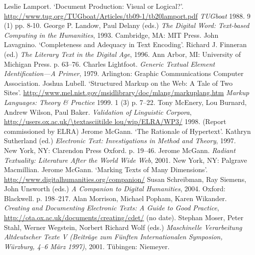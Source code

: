 \begin{bibitemlist}{1}
\label{Lamport1988a}Leslie Lamport. ‘Document Production: Visual or Logical?’.  \url{http://www.tug.org/TUGboat/Articles/tb09-1/tb20lamport.pdf} \textit{TUGboat} 1988. 9  (1)  pp. 8-10. 
\label{Landow1993a}George P. Landow, Paul Delany (eds.) \textit{The Digital Word: Text-based Computing in the Humanities}, 1993. Cambridge, MA: MIT Press. 
\label{Lavagnino1996}John Lavagnino. ‘Completeness and Adequacy in Text Encoding’. Richard J. Finneran (ed.) \textit{The Literary Text in the Digital Age}, 1996. Ann Arbor, MI: University of Michigan Press. p. 63–76. 
\label{Lightfoot1979}Charles Lightfoot. \textit{Generic Textual Element Identification—A Primer}, 1979. Arlington: Graphic Communications Computer Association. 
\label{Lubell1999}Joshua Lubell. ‘Structured Markup on the Web: A Tale of Two Sites’.  \url{http://www.mel.nist.gov/msidlibrary/doc/mlang/markuplang.htm} \textit{Markup Languages: Theory \& Practice} 1999. 1  (3)  p. 7–22. 
\label{McEneryetal1998}Tony McEnery, Lou Burnard, Andrew Wilson, Paul Baker. \textit{Validation of Linguistic Corpora},  \url{http://users.ox.ac.uk/\textasciitilde lou/wip/ELRA/WP3/} 1998.  (Report commissioned by ELRA)
\label{McGann1997}Jerome McGann. ‘The Rationale of Hypertext’. Kathryn Sutherland (ed.) \textit{Electronic Text: Investigations in Method and Theory}, 1997. New York, NY: Clarendon Press Oxford. p. 19–46. 
\label{McGann2001}Jerome McGann. \textit{Radiant Textuality: Literature After the World Wide Web}, 2001. New York, NY: Palgrave Macmillian. 
\label{McGann2004}Jerome McGann. ‘Marking Texts of Many Dimensions’.  \url{http://www.digitalhumanities.org/companion/} Susan Schreibman, Ray Siemens, John Unsworth (eds.) \textit{A Companion to Digital Humanities}, 2004. Oxford: Blackwell. p. 198–217. 
\label{Morrisonetalnodate}Alan Morrison, Michael Popham, Karen Wikander. \textit{Creating and Documenting Electronic Texts: A Guide to Good Practice},  \url{http://ota.ox.ac.uk/documents/creating/cdet/} (no date). 
\label{Moser2001a}Stephan Moser, Peter Stahl, Werner Wegstein, Norbert Richard Wolf (eds.) \textit{Maschinelle Verarbeitung Altdeutscher Texte V (Beiträge zum Fünften Internationalen Symposion, Würzburg, 4–6 März 1997)}, 2001. Tübingen: Niemeyer. 

\end{bibitemlist}
